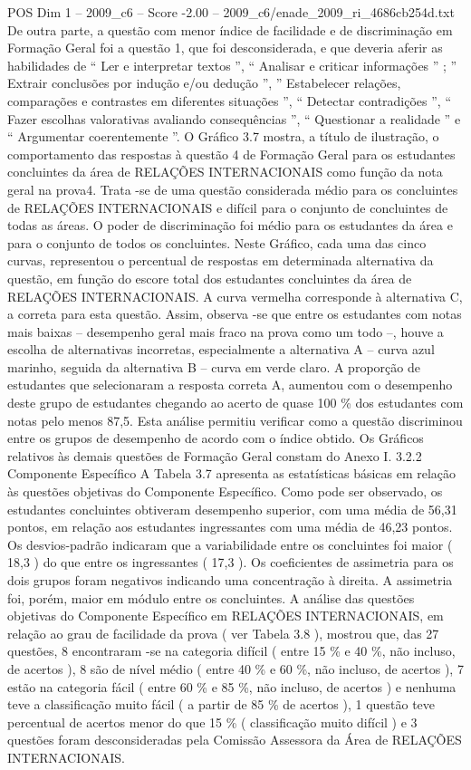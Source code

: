 \begin{textsample}{POS Dim 1 – 2009\_c6 – Score -2.00 – 2009\_c6/enade\_2009\_ri\_4686cb254d.txt}
De outra parte, a questão com menor índice de facilidade e de discriminação em Formação Geral foi a questão 1, que foi desconsiderada, e que deveria aferir as habilidades de “ Ler e interpretar textos ”, “ Analisar e criticar informações ” ; ” Extrair conclusões por indução e/ou dedução ”, ” Estabelecer relações, comparações e contrastes em diferentes situações ”, “ Detectar contradições ”, “ Fazer escolhas valorativas avaliando consequências ”, “ Questionar a realidade ” e “ Argumentar coerentemente ”.
O Gráfico 3.7 mostra, a título de ilustração, o comportamento das respostas à questão 4 de Formação Geral para os estudantes concluintes da área de RELAÇÕES INTERNACIONAIS como função da nota geral na prova4.
Trata -se de uma questão considerada médio para os concluintes de RELAÇÕES INTERNACIONAIS e difícil para o conjunto de concluintes de todas as áreas.
O poder de discriminação foi médio para os estudantes da área e para o conjunto de todos os concluintes.
Neste Gráfico, cada uma das cinco curvas, representou o percentual de respostas em determinada alternativa da questão, em função do escore total dos estudantes concluintes da área de RELAÇÕES INTERNACIONAIS.
A curva vermelha corresponde à alternativa C, a correta para esta questão.
Assim, observa -se que entre os estudantes com notas mais baixas – desempenho geral mais fraco na prova como um todo –, houve a escolha de alternativas incorretas, especialmente a alternativa A – curva azul marinho, seguida da alternativa B – curva em verde claro.
A proporção de estudantes que selecionaram a resposta correta A, aumentou com o desempenho deste grupo de estudantes chegando ao acerto de quase 100 \% dos estudantes com notas pelo menos 87,5.
Esta análise permitiu verificar como a questão discriminou entre os grupos de desempenho de acordo com o índice obtido.
Os Gráficos relativos às demais questões de Formação Geral constam do Anexo I. 3.2.2 Componente Específico A Tabela 3.7 apresenta as estatísticas básicas em relação às questões objetivas do Componente Específico.
Como pode ser observado, os estudantes concluintes obtiveram desempenho superior, com uma média de 56,31 pontos, em relação aos estudantes ingressantes com uma média de 46,23 pontos.
Os desvios-padrão indicaram que a variabilidade entre os concluintes foi maior ( 18,3 ) do que entre os ingressantes ( 17,3 ).
Os coeficientes de assimetria para os dois grupos foram negativos indicando uma concentração à direita.
A assimetria foi, porém, maior em módulo entre os concluintes.
A análise das questões objetivas do Componente Específico em RELAÇÕES INTERNACIONAIS, em relação ao grau de facilidade da prova ( ver Tabela 3.8 ), mostrou que, das 27 questões, 8 encontraram -se na categoria difícil ( entre 15 \% e 40 \%, não incluso, de acertos ), 8 são de nível médio ( entre 40 \% e 60 \%, não incluso, de acertos ), 7 estão na categoria fácil ( entre 60 \% e 85 \%, não incluso, de acertos ) e nenhuma teve a classificação muito fácil ( a partir de 85 \% de acertos ), 1 questão teve percentual de acertos menor do que 15 \% ( classificação muito difícil ) e 3 questões foram desconsideradas pela Comissão Assessora da Área de RELAÇÕES INTERNACIONAIS.

\end{textsample}
